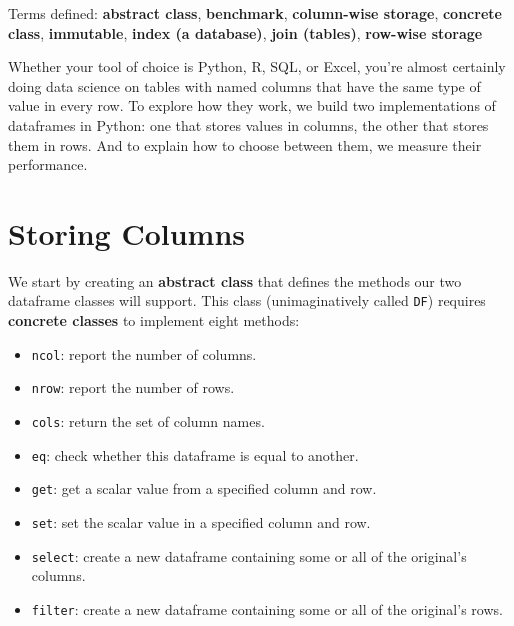 \documentclass{scrbook}
\newcommand{\glossref}[1]{\textbf{#1}}
\begin{document}
\noindent 
    Terms defined:
    \glossref{abstract class}, \glossref{benchmark}, \glossref{column-wise storage}, \glossref{concrete class}, \glossref{immutable}, \glossref{index (a database)}, \glossref{join (tables)}, \glossref{row-wise storage}



Whether your tool of choice is Python, R, SQL, or Excel,
you're almost certainly doing data science on tables
with named columns that have the same type of value in every row.
To explore how they work,
we build two implementations of dataframes in Python:
one that stores values in columns,
the other that stores them in rows.
And to explain how to choose between them,
we measure their performance.

\section{Storing Columns}\label{dataframe-cols}


We start by creating an \glossref{abstract class}
that defines the methods our two dataframe classes will support.
This class (unimaginatively called \texttt{DF})
requires \glossref{concrete classes} to implement eight methods:

\begin{itemize}

\item \texttt{ncol}: report the number of columns.

\item \texttt{nrow}: report the number of rows.

\item \texttt{cols}: return the set of column names.

\item \texttt{eq}: check whether this dataframe is equal to another.

\item \texttt{get}: get a scalar value from a specified column and row.

\item \texttt{set}: set the scalar value in a specified column and row.

\item \texttt{select}: create a new dataframe containing some or all of the original's columns.

\item \texttt{filter}: create a new dataframe containing some or all of the original's rows.

\end{itemize}
\end{document}
